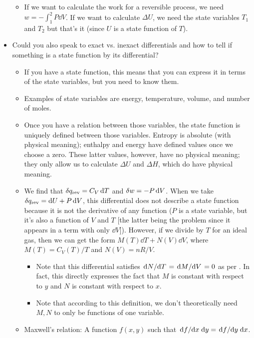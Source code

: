 \documentclass[../notes.tex]{subfiles}
\begin{document}
\begin{itemize}
\begin{itemize}
        \item If we want to calculate the work for a reversible process, we need $w=-\int_1^2P\dd{V}$. If we want to calculate $\Delta U$, we need the state variables $T_1$ and $T_2$ but that's it (since $U$ is a state function of $T$).
    \end{itemize}
    \item Could you also speak to exact vs. inexact differentials and how to tell if something is a state function by its differential?
    \begin{itemize}
        \item If you have a state function, this means that you can express it in terms of the state variables, but you need to know them.
        \item Examples of state variables are energy, temperature, volume, and number of moles.
        \item Once you have a relation between those variables, the state function is uniquely defined between those variables. Entropy is absolute (with physical meaning); enthalpy and energy have defined values once we choose a zero. These latter values, however, have no physical meaning; they only allow us to calculate $\Delta U$ and $\Delta H$, which do have physical meaning.
        \item We find that $\var{q_\text{rev}}=C_V\dd{T}$ and $\var{w}=-P\dd{V}$. When we take $\var{q_\text{rev}}=\dd{U}+P\dd{V}$, this differential does not describe a state function because it is not the derivative of any function ($P$ is a state variable, but it's also a function of $V$ and $T$ [the latter being the problem since it appears in a term with only $\dd{V}$]). However, if we divide by $T$ for an ideal gas, then we can get the form $M(T)\dd{T}+N(V)\dd{V}$, where $M(T)=C_V(T)/T$ and $N(V)=nR/V$.
        \begin{itemize}
            \item Note that this differential satisfies $\dv*{N}{T}=\dv*{M}{V}=0$ as per \textcite{bib:CAAGThomasNotes}. In fact, this directly expresses the fact that $M$ is constant with respect to $y$ and $N$ is constant with respect to $x$.
            \item Note that according to this definition, we don't theoretically need $M,N$ to only be functions of one variable.
        \end{itemize}
        \item Maxwell's relation: A function $f(x,y)$ such that $\dv*{f}{x}\dd{y}=\dv*{f}{y}\dd{x}$.
        \begin{itemize}

\end{itemize}
\end{itemize}
\end{itemize}
\end{document}
